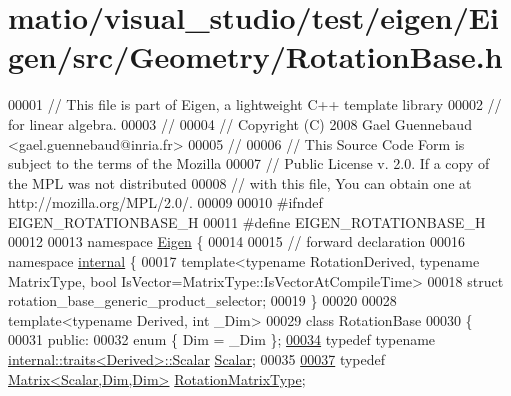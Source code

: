 \hypertarget{matio_2visual__studio_2test_2eigen_2_eigen_2src_2_geometry_2_rotation_base_8h_source}{}\section{matio/visual\+\_\+studio/test/eigen/\+Eigen/src/\+Geometry/\+Rotation\+Base.h}
\label{matio_2visual__studio_2test_2eigen_2_eigen_2src_2_geometry_2_rotation_base_8h_source}

\begin{DoxyCode}
00001 \textcolor{comment}{// This file is part of Eigen, a lightweight C++ template library}
00002 \textcolor{comment}{// for linear algebra.}
00003 \textcolor{comment}{//}
00004 \textcolor{comment}{// Copyright (C) 2008 Gael Guennebaud <gael.guennebaud@inria.fr>}
00005 \textcolor{comment}{//}
00006 \textcolor{comment}{// This Source Code Form is subject to the terms of the Mozilla}
00007 \textcolor{comment}{// Public License v. 2.0. If a copy of the MPL was not distributed}
00008 \textcolor{comment}{// with this file, You can obtain one at http://mozilla.org/MPL/2.0/.}
00009 
00010 \textcolor{preprocessor}{#ifndef EIGEN\_ROTATIONBASE\_H}
00011 \textcolor{preprocessor}{#define EIGEN\_ROTATIONBASE\_H}
00012 
00013 \textcolor{keyword}{namespace }\hyperlink{namespace_eigen}{Eigen} \{ 
00014 
00015 \textcolor{comment}{// forward declaration}
00016 \textcolor{keyword}{namespace }\hyperlink{namespaceinternal}{internal} \{
00017 \textcolor{keyword}{template}<\textcolor{keyword}{typename} RotationDerived, \textcolor{keyword}{typename} MatrixType, \textcolor{keywordtype}{bool} IsVector=MatrixType::IsVectorAtCompileTime>
00018 \textcolor{keyword}{struct }rotation\_base\_generic\_product\_selector;
00019 \}
00020 
00028 \textcolor{keyword}{template}<\textcolor{keyword}{typename} Derived, \textcolor{keywordtype}{int} \_Dim>
00029 \textcolor{keyword}{class }RotationBase
00030 \{
00031   \textcolor{keyword}{public}:
00032     \textcolor{keyword}{enum} \{ Dim = \_Dim \};
\hyperlink{class_eigen_1_1_rotation_base_af9b43eac462d7aa70b018efd49c13ef4}{00034}     \textcolor{keyword}{typedef} \textcolor{keyword}{typename} \hyperlink{struct_eigen_1_1internal_1_1traits}{internal::traits<Derived>::Scalar} 
      \hyperlink{class_eigen_1_1_rotation_base_af9b43eac462d7aa70b018efd49c13ef4}{Scalar};
00035 
\hyperlink{class_eigen_1_1_rotation_base_a83602509674c9d635551998460342951}{00037}     \textcolor{keyword}{typedef} \hyperlink{group___core___module_class_eigen_1_1_matrix}{Matrix<Scalar,Dim,Dim>} \hyperlink{class_eigen_1_1_rotation_base_a83602509674c9d635551998460342951}{RotationMatrixType};

\end{DoxyCode}

